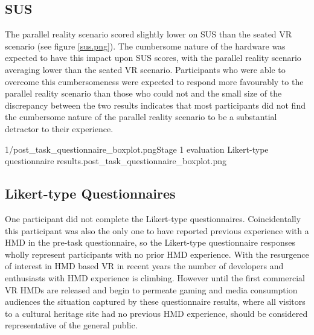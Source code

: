 
\subsection{SUS}
The parallel reality scenario scored slightly lower on SUS than the seated VR scenario (see figure \ref{sus.png}). The cumbersome nature of the hardware was expected to have this impact upon SUS scores, with the parallel reality scenario averaging lower than the seated VR scenario. Participants who were able to overcome this cumbersomeness were expected to respond more favourably to the parallel reality scenario than those who could not and the small size of the discrepancy between the two results indicates that most participants did not find the cumbersome nature of the parallel reality scenario to be a substantial detractor to their experience.

       {1/post_task_questionnaire_boxplot.png}{Stage 1 evaluation Likert-type questionnaire results.}{post_task_questionnaire_boxplot.png}


\subsection{Likert-type Questionnaires}

One participant did not complete the Likert-type questionnaires. Coincidentally this participant was also the only one to have reported previous experience with a HMD in the pre-task questionnaire, so the Likert-type questionnaire responses wholly represent participants with no prior HMD experience. With the resurgence of interest in HMD based VR in recent years the number of developers and enthusiasts with HMD experience is climbing. However until the first commercial VR HMDs are released and begin to permeate gaming and media consumption audiences the situation captured by these questionnaire results, where all visitors to a cultural heritage site had no previous HMD experience, should be considered representative of the general public.

